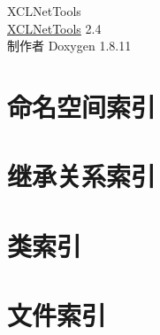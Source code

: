 \documentclass[twoside]{book}
\newcommand{\+}{\discretionary{\mbox{\scriptsize$\hookleftarrow$}}{}{}}
\newcommand{\clearemptydoublepage}{%
  \newpage{\pagestyle{empty}\cleardoublepage}%
}
\begin{document}
\hypersetup{pageanchor=false,
             bookmarksnumbered=true,
             pdfencoding=unicode
            }
\begin{titlepage}
\vspace*{7cm}
\begin{center}%
{\Large X\+C\+L\+Net\+Tools \\[1ex]\large \hyperlink{namespace_x_c_l_net_tools}{X\+C\+L\+Net\+Tools} 2.\+4 }\\
\vspace*{1cm}
{\large 制作者 Doxygen 1.8.11}\\
\end{center}
\end{titlepage}
\clearemptydoublepage
\tableofcontents
\clearemptydoublepage
{}
\hypersetup{pageanchor=true}

\chapter{命名空间索引}

\chapter{继承关系索引}

\chapter{类索引}

\chapter{文件索引}

\end{document}
